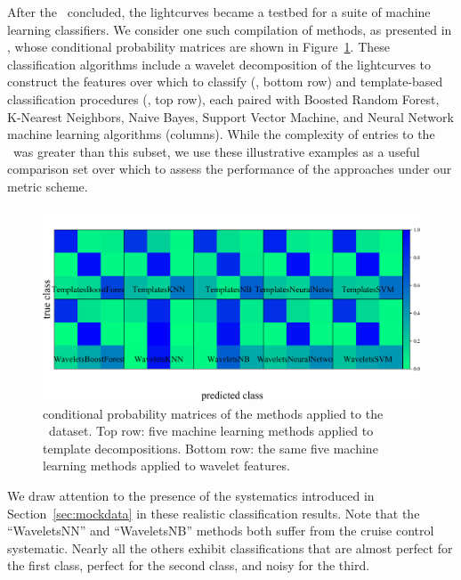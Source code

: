 After the \snphotcc\ concluded, the lightcurves became a testbed for a suite of machine learning classifiers.
We consider one such compilation of methods, as presented in \citet{lochner_photometric_2016}, whose conditional probability matrices are shown in Figure~\ref{fig:snphotcc_cm}.
These classification algorithms include a wavelet decomposition of the lightcurves to construct the features over which to classify (\citet{2011MNRAS.414.1987N}, bottom row) and template-based classification procedures (\citet{2011ApJ...738..162S}, top row), each paired with Boosted Random Forest, K-Nearest Neighbors, Naive Bayes, Support Vector Machine, and Neural Network machine learning algorithms (columns).
While the complexity of entries to the \snphotcc\ was greater than this subset, we use these illustrative examples as a useful comparison set over which to assess the performance of the approaches under our metric scheme.

\begin{figure}
	\begin{center}
    \includegraphics[width=\textwidth]{./fig/all_snphotcc_cm.png}
		\caption{conditional probability matrices of the \citet{lochner_photometric_2016} methods applied to the \snphotcc\ dataset.
    Top row: five machine learning methods applied to template decompositions.
    Bottom row: the same five machine learning methods applied to wavelet features.}
		\label{fig:snphotcc_cm}
	\end{center}
\end{figure}

We draw attention to the presence of the systematics introduced in Section~\ref{sec:mockdata} in these realistic classification results.
Note that the ``WaveletsNN'' and ``WaveletsNB'' methods both suffer from the cruise control systematic.
Nearly all the others exhibit classifications that are almost perfect for the first class, perfect for the second class, and noisy for the third.

